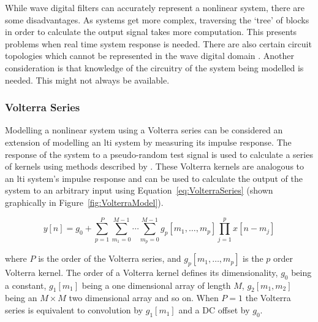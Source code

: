 			While wave digital filters can accurately represent a nonlinear system, there are some
			disadvantages. As systems get more complex, traversing the `tree' of blocks in order to calculate
			the output signal takes more computation. This presents problems when real time system response is
			needed. There are also certain circuit topologies which cannot be represented in the wave digital
			domain \citep{valimaki2011virtual}. Another consideration is that knowledge of the circuitry of the
			system being modelled is needed. This might not always be available.

		\subsubsection{Volterra Series}
			Modelling a nonlinear system using a Volterra series can be considered an extension of modelling an
			\acrshort{lti} system by measuring its impulse response. The response of the system to a
			pseudo-random test signal is used to calculate a series of kernels using methods described by
			\citet{schetzen1980the}.  These Volterra kernels are analogous to an \acrshort{lti} system's
			impulse response and can be used to calculate the output of the system to an arbitrary input using
			Equation~\ref{eq:VolterraSeries} (shown graphically in Figure~\ref{fig:VolterraModel}).

			\begin{equation}
				y[n] = g_{0} + \sum_{p = 1}^{P} 
					\sum_{m_{1} = 0}^{M - 1} \dotsi \sum_{m_{p} = 0}^{M - 1}
					g_{p}[m_{1}, \dotsc , m_{p}]
					\prod_{j = 1}^{p} x[n - m_{j}]
				\label{eq:VolterraSeries}
			\end{equation}

			where $P$ is the order of the Volterra series, and $g_{p}[m_{1}, \dotsc , m_{p}]$ is the
			$p$ order Volterra kernel. The order of a Volterra kernel defines its dimensionality,
			$g_{0}$ being a constant, $g_{1}[m_{1}]$ being a one dimensional array of length $M$, $g_{2}[m_{1},
			m_{2}]$ being an $M \times M$ two dimensional array and so on. When $P = 1$ the Volterra series is
			equivalent to convolution by $g_{1}[m_{1}]$ and a DC offset by $g_{0}$.

